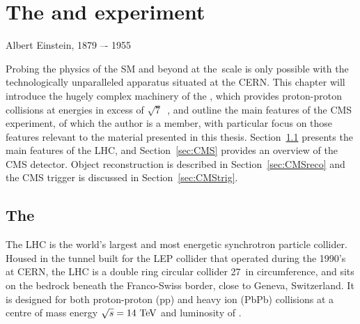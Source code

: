 
\chapter{The \LHC and \CMS experiment}
\label{chap:detector}

{Albert Einstein, 1879 –- 1955}

Probing the physics of the \ac{SM} and beyond at the~\TeV scale is only possible with the technologically unparalleled apparatus situated at the \ac{CERN}.
This chapter will introduce the hugely complex machinery of the \LHC, 
which provides proton-proton collisions at energies in excess of $\sqrt{7}$~\TeV, 
and outline the main features of the \ac{CMS} experiment, of which the author is a member, 
with particular focus on those features relevant to the material presented in this thesis.
%
Section~\ref{sec:LHC} presents the main features of the \ac{LHC}, and Section~\ref{sec:CMS} provides an overview of the \ac{CMS} detector. Object reconstruction is described in Section~\ref{sec:CMSreco} and the \ac{CMS} trigger is discussed in Section~\ref{sec:CMStrig}. 

%                                                                  

\section{The \LHC}
\label{sec:LHC}
The \ac{LHC} is the world's largest and most energetic synchrotron particle collider. 
Housed in the tunnel built for the \ac{LEP} collider that operated during the 1990's at \ac{CERN}, 
the \ac{LHC} is a double ring circular collider 27~\km in circumference, 
and sits on the bedrock beneath the Franco-Swiss border, close to Geneva, Switzerland. 
It is designed for both proton-proton (pp) and heavy ion (PbPb) collisions at a centre of mass energy $\sqrt{s} = 14~\mathrm{TeV}$ and luminosity of \designLumi.


